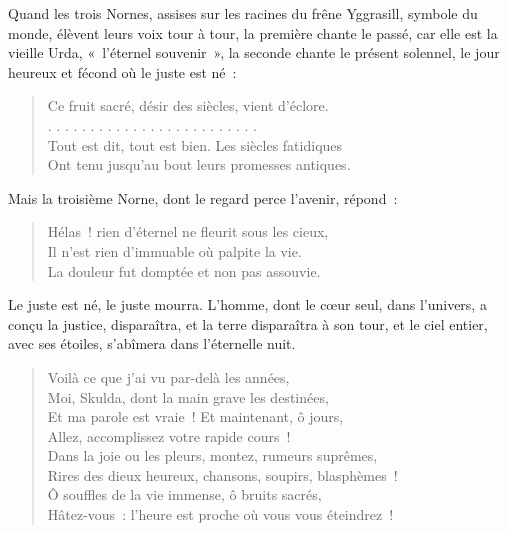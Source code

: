 \documentclass[french,twoside]{book} %
\begin{document}
\noindent Quand les trois Nornes, assises sur les racines du frêne Yggrasill, symbole du monde, élèvent leurs voix tour à tour, la première chante le passé, car elle est la vieille Urda, « l’éternel souvenir », la seconde chante le présent solennel, le jour heureux et fécond où le juste est né :\par


\begin{verse}
Ce fruit sacré, désir des siècles, vient d’éclore.\\
. . . . . . . . . . . . . . . . . . . . . . . . .\\
Tout est dit, tout est bien. Les siècles fatidiques\\
Ont tenu jusqu’au bout leurs promesses antiques.\\
\end{verse}

\noindent Mais la troisième Norne, dont le regard perce l’avenir, répond :\par


\begin{verse}
Hélas ! rien d’éternel ne fleurit sous les cieux,\\
Il n’est rien d’immuable où palpite la vie.\\
La douleur fut domptée et non pas assouvie.\\
\end{verse}

\noindent Le juste est né, le juste mourra. L’homme, dont le cœur seul, dans l’univers, a conçu la justice, disparaîtra, et la terre disparaîtra à son tour, et le ciel entier, avec ses étoiles, s’abîmera dans l’éternelle nuit.\par


\begin{verse}
Voilà ce que j’ai vu par-delà les années,\\
Moi, Skulda, dont la main grave les destinées,\\
Et ma parole est vraie ! Et maintenant, ô jours,\\
Allez, accomplissez votre rapide cours !\\
Dans la joie ou les pleurs, montez, rumeurs suprêmes,\\
Rires des dieux heureux, chansons, soupirs, blasphèmes !\\
Ô souffles de la vie immense, ô bruits sacrés,\\
Hâtez-vous : l’heure est proche où vous vous éteindrez !\\
\end{verse}
\end{document}
